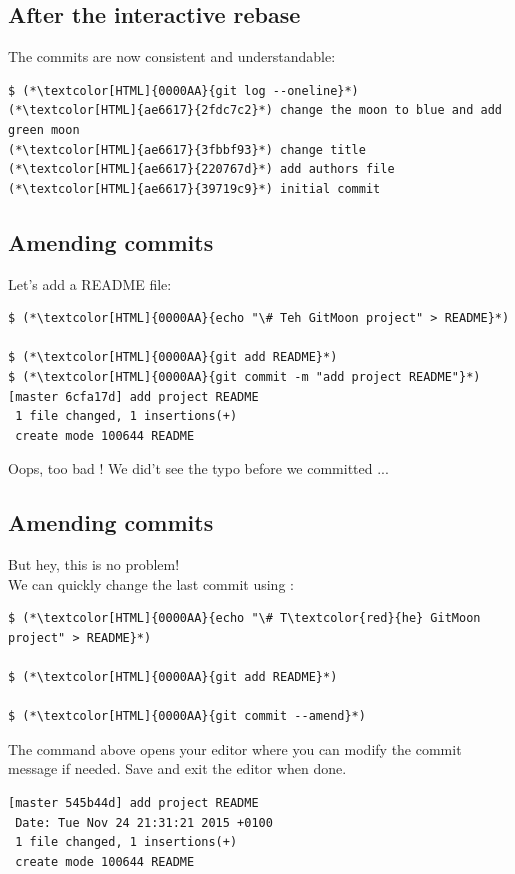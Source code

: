 \subsection{After the interactive rebase}
\begin{frame}[fragile]
  \subslidetitle

  The commits are now consistent and understandable:
  \begin{lstlisting}
$ (*\textcolor[HTML]{0000AA}{git log --oneline}*)
(*\textcolor[HTML]{ae6617}{2fdc7c2}*) change the moon to blue and add green moon
(*\textcolor[HTML]{ae6617}{3fbbf93}*) change title
(*\textcolor[HTML]{ae6617}{220767d}*) add authors file
(*\textcolor[HTML]{ae6617}{39719c9}*) initial commit
\end{lstlisting}

\end{frame}


\subsection{Amending commits}
\begin{frame}[fragile]
  \subslidetitle

  Let's add a README file:

  \begin{lstlisting}
$ (*\textcolor[HTML]{0000AA}{echo "\# Teh GitMoon project" > README}*)

$ (*\textcolor[HTML]{0000AA}{git add README}*)
$ (*\textcolor[HTML]{0000AA}{git commit -m "add project README"}*)
[master 6cfa17d] add project README
 1 file changed, 1 insertions(+)
 create mode 100644 README
\end{lstlisting}

  \vspace{1em}
  Oops, too bad ! We did't see the typo before we committed ...
\end{frame}


\subsection{Amending commits}
\begin{frame}[fragile]
  \subslidetitle
  But hey, this is no problem!\\
  \vspace{1em}
  We can quickly change the last commit using :

  \begin{lstlisting}
$ (*\textcolor[HTML]{0000AA}{echo "\# T\textcolor{red}{he} GitMoon project" > README}*)

$ (*\textcolor[HTML]{0000AA}{git add README}*)

$ (*\textcolor[HTML]{0000AA}{git commit --amend}*)
\end{lstlisting}
The command above opens your editor where you can modify the commit message if needed. Save and exit the editor when done.
\begin{lstlisting}
[master 545b44d] add project README
 Date: Tue Nov 24 21:31:21 2015 +0100
 1 file changed, 1 insertions(+)
 create mode 100644 README
\end{lstlisting}

\end{frame}

